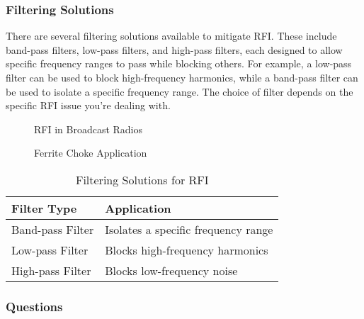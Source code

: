 \subsubsection*{Filtering Solutions}
There are several filtering solutions available to mitigate RFI. These include band-pass filters, low-pass filters, and high-pass filters, each designed to allow specific frequency ranges to pass while blocking others. For example, a low-pass filter can be used to block high-frequency harmonics, while a band-pass filter can be used to isolate a specific frequency range. The choice of filter depends on the specific RFI issue you're dealing with.

\begin{figure}[h]
    \centering
    \caption{RFI in Broadcast Radios}
    \label{fig:rfi-broadcast}
\end{figure}

\begin{figure}[h]
    \centering
    \caption{Ferrite Choke Application}
    \label{fig:ferrite-choke}
\end{figure}

\begin{table}[h]
    \centering
    \begin{tabular}{|l|l|}
        \hline
        \textbf{Filter Type} & \textbf{Application} \\
        \hline
        Band-pass Filter & Isolates a specific frequency range \\
        Low-pass Filter & Blocks high-frequency harmonics \\
        High-pass Filter & Blocks low-frequency noise \\
        \hline
    \end{tabular}
    \caption{Filtering Solutions for RFI}
    \label{tab:rfi-filters}
\end{table}

\subsubsection{Questions}

